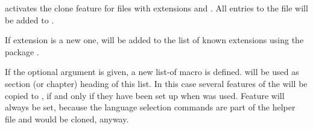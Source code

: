 \begin{Declaration}
\end{Declaration}
%
activates the clone feature for files with extensions  and
. All entries to the file
 will be added to
.

If extension  is a new one,  will be
added to the list of known extensions using the \KOMAScript{} package
.

If the optional argument  is given, a new list-of macro
 is defined.  will be used
as section (or chapter) heading of this list. In this case several
 features of the  will be copied to
, if and only if they have been set up when
 was used. Feature  will always be set,
because the language selection commands are part of the helper file and
would be cloned, anyway.

